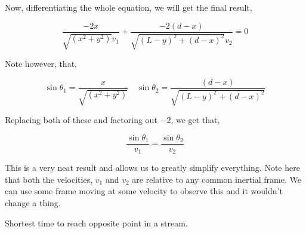 Now, differentiating the whole equation, we will get the final result,

\begin{equation}
    \frac{-2x}{\sqrt{(x^2+y^2)}v_1} + \frac{-2(d-x)}{\sqrt{(L-y)^2 + (d-x)^2}v_2} = 0 
\end{equation}

Note however, that, 

\begin{equation*}
    \sin\theta_1 = \frac{x}{\sqrt{(x^2+y^2)}} \quad \sin\theta_2 = \frac{(d-x)}{\sqrt{(L-y)^2 + (d-x)^2}}
\end{equation*}

Replacing both of these and factoring out \(-2\), we get that, 

\begin{equation}
    \boxed{\frac{\sin\theta_1}{v_1} = \frac{\sin\theta_2}{v_2}}
\end{equation}

This is a very neat result and allows us to greatly simplify everything. Note 
here that both the velocities, \(v_1\) and \(v_2\) are relative to any common inertial
frame. We can use some frame moving at some velocity to observe this and it wouldn't change 
a thing. 

\begin{marginfigure}
    \vspace{5em}
    \centering
    \caption{Shortest time to reach opposite point in a stream.}
    \label{fig: fermat example}
\end{marginfigure}

